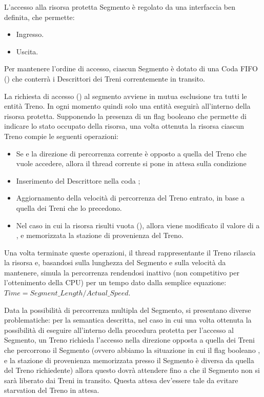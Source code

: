 		L'accesso alla risorsa protetta Segmento è regolato da una interfaccia ben definita, che permette:
			\begin{itemize}
				\item Ingresso.
				\item Uscita.
			\end{itemize}
		Per mantenere l'ordine di accesso, ciascun Segmento  è dotato di una Coda FIFO () che conterrà i Descrittori dei Treni correntemente in transito.		
		\begin{description}
			
			\item {}
			
			La richiesta di accesso () al segmento avviene in mutua esclusione tra tutti le entità Treno. In ogni momento quindi solo una entità eseguirà all'interno della risorsa protetta. Supponendo la presenza di un flag booleano  che permette di indicare lo stato occupato della risorsa, una volta ottenuta la risorsa ciascun Treno compie le seguenti operazioni:
			 \begin{itemize}
			 	\item Se  e la direzione di percorrenza corrente è opposto a quella del Treno che vuole accedere, allora il thread corrente si pone in attesa sulla condizione 
			 	\item Inserimento del Descrittore nella coda ;
			 	\item Aggiornamento della velocità di percorrenza del Treno entrato, in base a quella dei Treni che lo precedono.
			 	\item Nel caso in cui la risorsa risulti vuota (), allora viene modificato il valore di  a  , e memorizzata la stazione di provenienza del Treno.
			\end{itemize}
			
			Una volta terminate queste operazioni, il thread rappresentante il Treno rilascia la risorsa e, basandosi sulla lunghezza del Segmento e sulla velocità da mantenere, simula la percorrenza rendendosi inattivo (non competitivo per l'ottenimento della CPU) per un tempo dato dalla semplice equazione: $ Time = Segment\_Length / Actual\_Speed $.
			
			Data la possibilità di percorrenza multipla del Segmento, si presentano diverse problematiche: per la semantica descritta,  nel caso in cui una volta ottenuta la possibilità di eseguire all'interno della procedura protetta per l'accesso al Segmento, un Treno richieda l'accesso nella direzione opposta a quella dei Treni che percorrono il Segmento (ovvero abbiamo la situazione in cui il flag booleano , e la stazione di provenienza memorizzata presso il Segmento è diversa da quella del Treno richiedente) allora questo dovrà attendere  fino a che il Segmento non si sarà liberato dai Treni in transito. Questa attesa dev'essere tale da evitare starvation del Treno in attesa.
			

\end{description}
